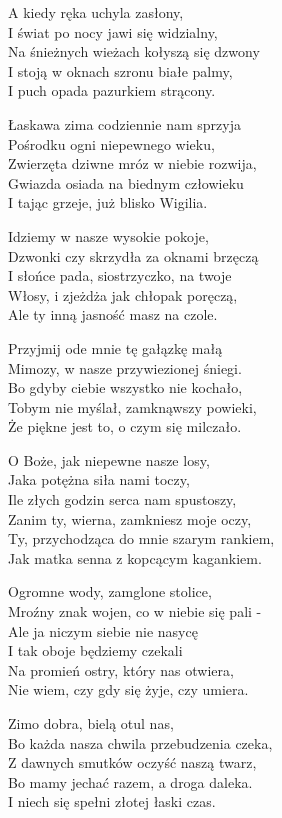 \begin{text}
    A kiedy ręka uchyla zasłony,\\
    I świat po nocy jawi się widzialny,\\
    Na śnieżnych wieżach kołyszą się dzwony\\
    I stoją w oknach szronu białe palmy,\\
    I puch opada pazurkiem strącony.

    Łaskawa zima codziennie nam sprzyja\\
    Pośrodku ogni niepewnego wieku,\\
    Zwierzęta dziwne mróz w niebie rozwija,\\
    Gwiazda osiada na biednym człowieku\\
    I tając grzeje, już blisko Wigilia.

    Idziemy w nasze wysokie pokoje,\\
    Dzwonki czy skrzydła za oknami brzęczą\\
    I słońce pada, siostrzyczko, na twoje\\
    Włosy, i zjeżdża jak chłopak poręczą,\\
    Ale ty inną jasność masz na czole.

    Przyjmij ode mnie tę gałązkę małą\\
    Mimozy, w nasze przywiezionej śniegi.\\
    Bo gdyby ciebie wszystko nie kochało,\\
    Tobym nie myślał, zamknąwszy powieki,\\
    Że piękne jest to, o czym się milczało.

    O Boże, jak niepewne nasze losy,\\
    Jaka potężna siła nami toczy,\\
    Ile złych godzin serca nam spustoszy,\\
    Zanim ty, wierna, zamkniesz moje oczy,\\
    Ty, przychodząca do mnie szarym rankiem,\\
    Jak matka senna z kopcącym kagankiem.

    Ogromne wody, zamglone stolice,\\
    Mroźny znak wojen, co w niebie się pali -\\
    Ale ja niczym siebie nie nasycę\\
    I tak oboje będziemy czekali\\
    Na promień ostry, który nas otwiera,\\
    Nie wiem, czy gdy się żyje, czy umiera.

    Zimo dobra, bielą otul nas,\\
    Bo każda nasza chwila przebudzenia czeka,\\
    Z dawnych smutków oczyść naszą twarz,\\
    Bo mamy jechać razem, a droga daleka.\\
    I niech się spełni złotej łaski czas.
\end{text}
\begin{chord}

\end{chord}